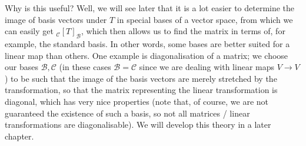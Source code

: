 \documentclass[../linear_algebra_and_groups.tex]{subfiles}
\begin{document}
Why is this useful?
Well, we will see later that it is a lot easier to determine the image of basis vectors under $T$ in special bases of a vector space, from which we can easily get ${}_\mathcal{C}[T]_{\mathcal{B}}$, which then allows us to find the matrix in terms of, for example, the standard basis.
In other words, some bases are better suited for a linear map than others.
One example is diagonalisation of a matrix; we choose our bases $\mathcal{B},\mathcal{C}$ (in these cases $\mathcal{B}=\mathcal{C}$ since we are dealing with linear maps $V\to V$) to be such that the image of the basis vectors are merely stretched by the transformation, so that the matrix representing the linear transformation is diagonal, which has very nice properties (note that, of course, we are not guaranteed the existence of such a basis, so not all matrices / linear transformations are diagonalisable).
We will develop this theory in a later chapter.
\end{document}
